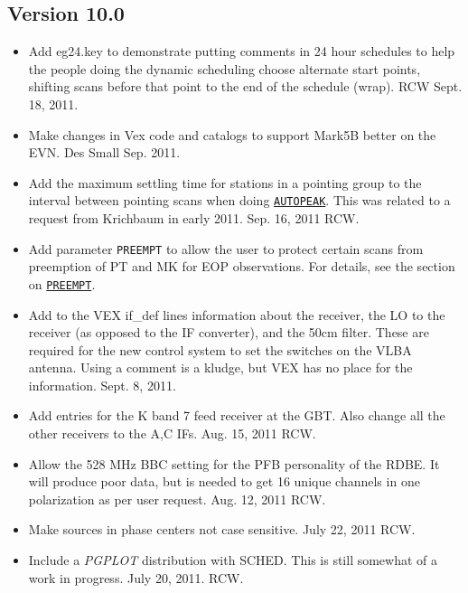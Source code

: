 \documentclass{report}
\newcommand{\sched}{{\sc SCHED}}
\begin{document}
\subsection{\label{SSEC:VER_10.0}Version 10.0}

\begin{itemize}

\item Add eg24.key to demonstrate putting comments in 24 hour schedules
to help the people doing the dynamic scheduling choose alternate 
start points, shifting scans before that point to the end of the schedule
(wrap).  RCW  Sept. 18, 2011.

\item Make changes in Vex code and catalogs to support Mark5B better
on the EVN.  Des Small Sep. 2011.

\item Add the maximum settling time for stations in a pointing group
to the interval between pointing scans when doing 
{\hyperref[MP:AUTOPEAK]{{\tt AUTOPEAK}}}.  This was related to a 
request from Krichbaum in early 2011.  Sep. 16, 2011  RCW.

\item Add parameter {\tt PREEMPT} to allow the user to protect certain
scans from preemption of PT and MK for EOP observations. For details,
see the section on 
{\hyperref[MP:PREEMPT]{{\tt PREEMPT}}}.

\item Add to the VEX if\_def lines information about the receiver, the
LO to the receiver (as opposed to the IF converter), and the 50cm
filter.  These are required for the new control system to set the
switches on the VLBA antenna.  Using a comment is a kludge, but VEX
has no place for the information.  Sept. 8, 2011.

\item Add entries for the K band 7 feed receiver at the GBT.  Also 
change all the other receivers to the A,C IFs.  Aug. 15, 2011  RCW.

\item Allow the 528 MHz BBC setting for the PFB personality of the
RDBE.  It will produce poor data, but is needed to get 16 unique
channels in one polarization as per user request.  Aug. 12, 2011  RCW.

\item Make sources in phase centers not case sensitive.  July 22, 2011 RCW.

\item Include a {\sl PGPLOT} distribution with \sched.  
This is still somewhat of a work in progress.  July 20, 2011. RCW.


\end{itemize}
\end{document}
